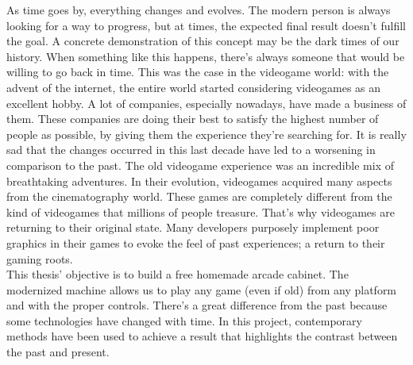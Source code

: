 \begin{thesisabstract}[english]
As time goes by, everything changes and evolves. The modern person is always looking for a way to progress, but at times, the expected final result doesn’t fulfill the goal. A concrete demonstration of this concept may be the dark times of our history. When something like this happens, there’s always someone that would be willing to go back in time.  This was the case in the videogame world: with the advent of the internet, the entire world started considering videogames as an excellent hobby. A lot of companies, especially nowadays, have made a business of them. These companies are  doing their best to satisfy the highest number of people as possible, by giving them the experience they’re searching for. It is really sad that the changes occurred in this last decade have led to a worsening in comparison to the past. The old videogame experience was an incredible mix of breathtaking adventures. In their evolution, videogames acquired many aspects from the cinematography world. These games are completely different from the kind of videogames that millions of people treasure. That’s why videogames are returning to their original state. Many developers purposely implement poor graphics in their games to evoke the feel of past experiences; a return to their gaming roots.\\This thesis’ objective is to build a free homemade arcade cabinet. The modernized machine allows us to play any game (even if old) from any platform and with the proper controls. There’s a great difference from the past because some technologies have changed with time. In this project, contemporary methods have been used to achieve a result that highlights the contrast between the past and present.
\end{thesisabstract}
